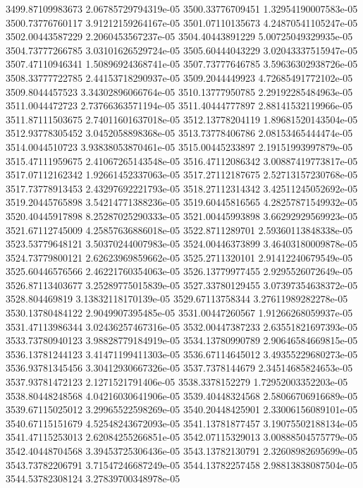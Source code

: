 {3499.87109983673 2.06785729794319e-05
3500.33776709451 1.32954190007583e-05
3500.73776760117 3.91212159264167e-05
3501.07110135673 4.24870541105247e-05
3502.00443587229 2.2060453567237e-05
3504.40443891229 5.00725049329935e-05
3504.73777266785 3.03101626529724e-05
3505.60444043229 3.02043337515947e-05
3507.47110946341 1.50896924368741e-05
3507.73777646785 3.59636302938726e-05
3508.33777722785 2.44153718290937e-05
3509.2044449923 4.72685491772102e-05
3509.8044457523 3.34302896066764e-05
3510.13777950785 2.29192285484963e-05
3511.0044472723 2.73766363571194e-05
3511.40444777897 2.88141532119966e-05
3511.87111503675 2.74011601637018e-05
3512.13778204119 1.89681520143504e-05
3512.93778305452 3.0452058898368e-05
3513.73778406786 2.08153465444474e-05
3514.0044510723 3.93838053870461e-05
3515.00445233897 2.19151993997879e-05
3515.47111959675 2.41067265143548e-05
3516.47112086342 3.00887419773817e-05
3517.07112162342 1.92661452337063e-05
3517.27112187675 2.52713157230768e-05
3517.73778913453 2.43297692221793e-05
3518.27112314342 3.42511245052692e-05
3519.20445765898 3.54214771388236e-05
3519.60445816565 4.28257871549932e-05
3520.40445917898 8.25287025290333e-05
3521.00445993898 3.66292929569923e-05
3521.67112745009 4.25857636886018e-05
3522.8711289701 2.59360113848338e-05
3523.53779648121 3.50370244007983e-05
3524.00446373899 3.46403180009878e-05
3524.73779800121 2.62623969859662e-05
3525.2711320101 2.91412240679549e-05
3525.60446576566 2.46221760354063e-05
3526.13779977455 2.9295526072649e-05
3526.87113403677 3.25289775015839e-05
3527.33780129455 3.07397354638372e-05
3528.804469819 3.13832118170139e-05
3529.67113758344 3.27611989282278e-05
3530.13780484122 2.9049907395485e-05
3531.00447260567 1.91266268059937e-05
3531.47113986344 3.02436257467316e-05
3532.00447387233 2.63551821697393e-05
3533.73780940123 3.98828779184919e-05
3534.13780990789 2.90646584669815e-05
3536.13781244123 3.41471199411303e-05
3536.67114645012 3.49355229680273e-05
3536.93781345456 3.30412930667326e-05
3537.7378144679 2.34514685824653e-05
3537.93781472123 2.1271521791406e-05
3538.3378152279 1.72952003352203e-05
3538.80448248568 4.04216030641906e-05
3539.40448324568 2.58066706916689e-05
3539.67115025012 3.29965522598269e-05
3540.20448425901 2.33006156089101e-05
3540.67115151679 4.52548243672093e-05
3541.13781877457 3.19075502188134e-05
3541.47115253013 2.62084255266851e-05
3542.07115329013 3.00888504575779e-05
3542.40448704568 3.39453725306436e-05
3543.13782130791 2.32608982695699e-05
3543.73782206791 3.71547246687249e-05
3544.13782257458 2.98813838087504e-05
3544.53782308124 3.27839700348978e-05
}
